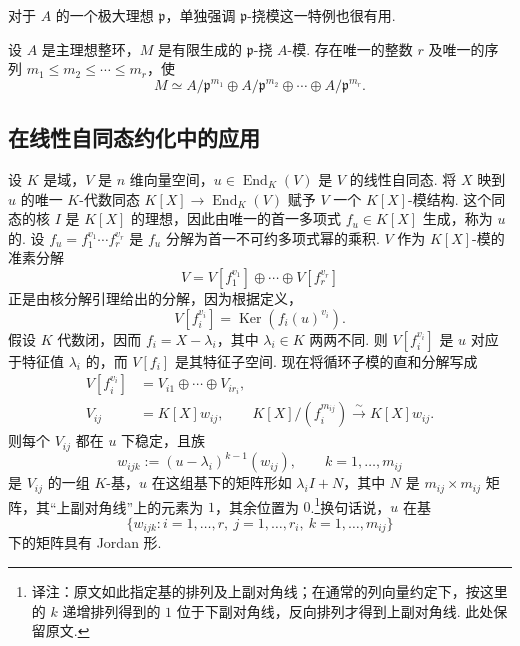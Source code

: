 对于 $A$ 的一个极大理想 $\mathfrak p$，单独强调 $\mathfrak p$-挠模这一特例也很有用.
\begin{corollary*}
设 $A$ 是主理想整环，$M$ 是有限生成的 $\mathfrak p$-挠 $A$-模. 存在唯一的整数 $r$ 及唯一的序列 $m_1\le m_2\le\cdots\le m_r$，使
\[M\simeq A/\mathfrak p^{m_1}\oplus A/\mathfrak p^{m_2}\oplus\cdots\oplus A/\mathfrak p^{m_r}.\]
\end{corollary*}
\subsection{在线性自同态约化中的应用}\label{sec:galois-1-10-6}
设 $K$ 是域，$V$ 是 $n$ 维向量空间，$u\in\operatorname{End}_K(V)$ 是 $V$ 的线性自同态. 将 $X$ 映到 $u$ 的唯一 $K$-代数同态 $K[X]\longrightarrow\operatorname{End}_K(V)$ 赋予 $V$ 一个 $K[X]$-模结构. 这个同态的核 $I$ 是 $K[X]$ 的理想，因此由唯一的首一多项式 $f_u\in K[X]$ 生成，称为 $u$ 的. 设 $f_u=f_1^{v_1}\cdots f_r^{v_r}$ 是 $f_u$ 分解为首一不可约多项式幂的乘积. $V$ 作为 $K[X]$-模的准素分解
\[V=V[f_1^{v_1}]\oplus\cdots\oplus V[f_r^{v_r}]\]
正是由核分解引理给出的分解，因为根据定义，
\[V[f_i^{v_i}]=\operatorname{Ker}(f_i(u)^{v_i}).\]
假设 $K$ 代数闭，因而 $f_i=X-\lambda_i$，其中 $\lambda_i\in K$ 两两不同. 则 $V[f_i^{v_i}]$ 是 $u$ 对应于特征值 $\lambda_i$ 的，而 $V[f_i]$ 是其特征子空间. 现在将循环子模的直和分解写成
\begin{align*}
V[f_i^{v_i}]&=V_{i1}\oplus\cdots\oplus V_{ir_i},\\
V_{ij}&=K[X]w_{ij},\qquad K[X]/(f_i^{m_{ij}})\xrightarrow{\sim}K[X]w_{ij}.
\end{align*}
则每个 $V_{ij}$ 都在 $u$ 下稳定，且族
\[w_{ijk}:=(u-\lambda_i)^{k-1}(w_{ij}),\qquad k=1,\ldots,m_{ij}\]
是 $V_{ij}$ 的一组 $K$-基，$u$ 在这组基下的矩阵形如 $\lambda_iI+N$，其中 $N$ 是 $m_{ij}\times m_{ij}$ 矩阵，其``上副对角线''上的元素为 $1$，其余位置为 $0$.\footnote{译注：原文如此指定基的排列及上副对角线；在通常的列向量约定下，按这里的 $k$ 递增排列得到的 $1$ 位于下副对角线，反向排列才得到上副对角线. 此处保留原文.}换句话说，$u$ 在基
\[\{w_{ijk}:i=1,\ldots,r,\ j=1,\ldots,r_i,\ k=1,\ldots,m_{ij}\}\]
下的矩阵具有 Jordan 形.


